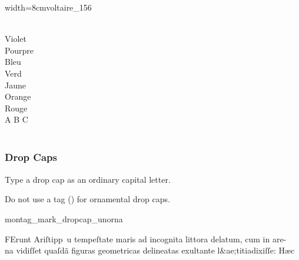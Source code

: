 \begin{sampleImageSmall}{width=8cm}{voltaire_156}
\begin{typeLatin}
 \\
Violet \\
Pourpre \\
Bleu \\
Verd \\
Jaune \\
Orange \\
Rouge \\
A B C \\
 \\
\end{typeLatin}
\end{sampleImageSmall}

\subsubsection{Drop Caps}
\label{section drop caps}

\begin{mainrule}
Type a drop cap as an ordinary capital letter.
\end{mainrule}

\begin{clarification}
Do not use a  tag () for ornamental drop caps.
\end{clarification}

\vspace{2mm}
\begin{sampleImage}{montag_mark_dropcap_unorna}
\begin{typeLatin}
FErunt Ariſtipp\bs~u tempeſtate maris ad incognita littora delatum, cum in are- \\
na vidiſſet quaſdã figuras geometricas delineatas exultant\bs\tld{}e l&ae;titia\lwr dixiſſe: Hæc \\
\someText {}
\end{typeLatin}
\end{sampleImage}

